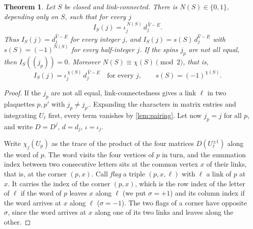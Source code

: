 \documentclass[11pt,a4paper]{amsart}
\newtheorem{theorem}{Theorem}[section]
\theoremstyle{definition}
\theoremstyle{remark}
\numberwithin{equation}{section}
\begin{document}
\begin{theorem}\label{thm:surface-integral}
Let $S$ be closed and link-connected. There is $N(S)\in\{0,1\}$, depending only on $S$, such that for every $j$
\[
I_S(j)=\iota_j^{\,N(S)}\,d_j^{\,\hat V-E}.
\]
Thus $I_S(j)=d_j^{\hat V-E}$ for every integer $j$, and $I_S(j)=s(S)\,d_j^{\hat V-E}$ with $s(S)=(-1)^{N(S)}$ for every half-integer $j$. If the spins $j_p$ are not all equal, then $I_S((j_p))=0$. Moreover $N(S)\equiv\chi(S)\pmod 2$, that is,
\begin{equation}\label{eq:crosscap-sign}
I_S(j)=\iota_j^{\,\chi(S)}\,d_j^{\,\hat V-E}\quad\text{for every }j,\qquad s(S)=(-1)^{\chi(S)}.
\end{equation}
\end{theorem}

\begin{proof}
If the $j_p$ are not all equal, link-connectedness gives a link $\ell$ in two plaquettes $p,p'$ with $j_p\ne j_{p'}$. Expanding the characters in matrix entries and integrating $U_\ell$ first, every term vanishes by \cref{lem:pairing}. Let now $j_p=j$ for all $p$, and write $D=D^j$, $d=d_j$, $\iota=\iota_j$.

Write $\chi_j(U_p)$ as the trace of the product of the four matrices $D(U_\ell^{\pm1})$ along the word of $p$. The word visits the four vertices of $p$ in turn, and the summation index between two consecutive letters sits at the common vertex $x$ of their links, that is, at the corner $(p,x)$. Call \emph{flag} a triple $(p,x,\ell)$ with $\ell$ a link of $p$ at $x$. It carries the index of the corner $(p,x)$, which is the row index of the letter of $\ell$ if the word of $p$ leaves $x$ along $\ell$ (we put $\sigma=+1$) and its column index if the word arrives at $x$ along $\ell$ ($\sigma=-1$). The two flags of a corner have opposite $\sigma$, since the word arrives at $x$ along one of its two links and leaves along the other.


\end{proof}
\end{document}
